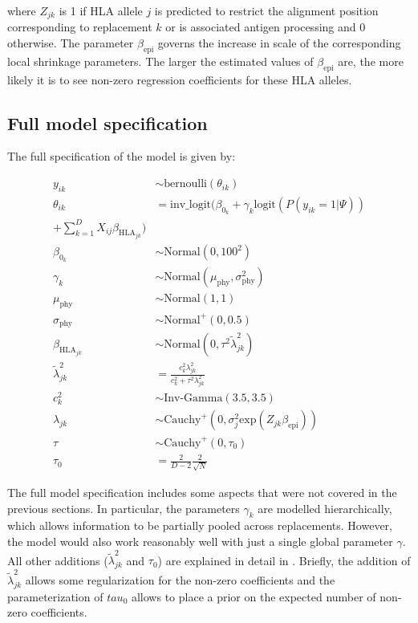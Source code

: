 \documentclass[fleqn,11pt]{SelfArx} %
\begin{document}
where \(Z_{jk}\) is 1 if HLA allele \(j\) is predicted to restrict the alignment position corresponding to replacement \(k\) or is associated antigen processing and 0 otherwise.
The parameter \(\beta_{\text{epi}}\) governs the increase in scale of the  corresponding local shrinkage parameters. The larger the estimated values of \(\beta_{\text{epi}}\) are, the more likely it is to see non-zero regression coefficients for these HLA alleles.

\subsection*{Full model specification}

The full specification of the model is given by:

\begin{equation}
  \label{eq:full}
  \begin{aligned}
    y_{ik} &\sim \text{bernoulli}(\theta_{ik})\\
    \theta_{ik} &= \text{inv\_logit}(\beta_{0_{k}} + \gamma_{k}\text{logit}(P(y_{ik}=1|\Psi))\\
        +\sum_{k=1}^{D}X_{ij}\beta_{\text{HLA}_{jk}})\\
    \beta_{0_{k}} &\sim \text{Normal}(0, 100^2)\\
    \gamma_{k} &\sim \text{Normal}(\mu_{\text{phy}}, \sigma_{\text{phy}}^2)\\
    \mu_{\text{phy}} &\sim \text{Normal}(1, 1)\\
    \sigma_{\text{phy}} &\sim \text{Normal}^{+}(0, 0.5)\\
    \beta_{\text{HLA}_{jk}} &\sim \text{Normal}(0, \tau^{2}\tilde{\lambda}^{2}_{jk})\\
    \tilde{\lambda}^{2}_{jk} &= \frac{c_{k}^{2}\lambda_{jk}^{2}}{c_{k}^{2} + \tau^{2}\lambda_{jk}^{2}} \\
    c_{k}^2 &\sim \text{Inv-Gamma}(3.5, 3.5)\\
    \lambda_{jk} &\sim \text{Cauchy}^{+}(0, \sigma_{j}^2\text{exp}(Z_{jk}\beta_{\text{epi}}))\\
    \tau &\sim \text{Cauchy}^{+}(0, \tau_{0})\\
    \tau_{0} &= \frac{2}{D-2}\frac{2}{\sqrt{N}}
  \end{aligned}
\end{equation}

The full model specification includes some aspects that were not covered in the previous sections. In particular, the parameters \(\gamma_{k}\) are modelled hierarchically, which allows information to be partially pooled across replacements. However, the model would also work reasonably well with just a single global parameter \(\gamma\). All other additions (\(\tilde{\lambda}_{jk}^{2}\) and \(\tau_0\)) are explained in detail in \cite{Piironen2017}. Briefly, the addition of  \(\tilde{\lambda}_{jk}^{2}\) allows some regularization for the non-zero coefficients and the parameterization of \(tau_{0}\) allows to place a prior on the expected number of non-zero coefficients.
\end{document}
